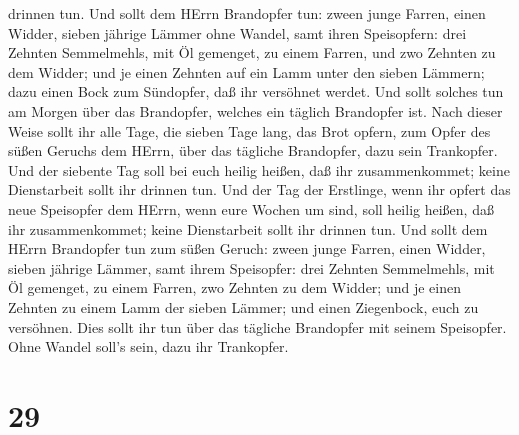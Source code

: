 drinnen tun.  Und sollt dem HErrn Brandopfer tun: zween
junge Farren, einen Widder, sieben jährige Lämmer ohne Wandel,
 samt ihren Speisopfern: drei Zehnten Semmelmehls, mit Öl
gemenget, zu einem Farren, und zwo Zehnten zu dem Widder; 
und je einen Zehnten auf ein Lamm unter den sieben Lämmern;
 dazu einen Bock zum Sündopfer, daß ihr versöhnet werdet.
 Und sollt solches tun am Morgen über das Brandopfer,
welches ein täglich Brandopfer ist.  Nach dieser Weise
sollt ihr alle Tage, die sieben Tage lang, das Brot opfern, zum Opfer
des süßen Geruchs dem HErrn, über das tägliche Brandopfer, dazu sein
Trankopfer.  Und der siebente Tag soll bei euch heilig
heißen, daß ihr zusammenkommet; keine Dienstarbeit sollt ihr drinnen
tun.  Und der Tag der Erstlinge, wenn ihr opfert das neue
Speisopfer dem HErrn, wenn eure Wochen um sind, soll heilig heißen, daß
ihr zusammenkommet; keine Dienstarbeit sollt ihr drinnen tun.
 Und sollt dem HErrn Brandopfer tun zum süßen Geruch: zween
junge Farren, einen Widder, sieben jährige Lämmer,  samt
ihrem Speisopfer: drei Zehnten Semmelmehls, mit Öl gemenget, zu einem
Farren, zwo Zehnten zu dem Widder;  und je einen Zehnten zu
einem Lamm der sieben Lämmer;  und einen Ziegenbock, euch
zu versöhnen.  Dies sollt ihr tun über das tägliche
Brandopfer mit seinem Speisopfer. Ohne Wandel soll's sein, dazu ihr
Trankopfer.

\hypertarget{section-28}{%
\section{29}\label{section-28}}

